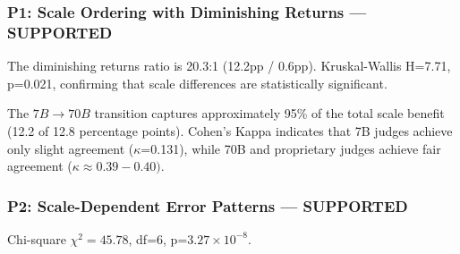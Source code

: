 
\subsubsection{P1: Scale Ordering with Diminishing Returns --- SUPPORTED}

\begin{table}[htbp]
\centering
{}
\end{table}

The diminishing returns ratio is 20.3:1 (12.2pp / 0.6pp). Kruskal-Wallis H=7.71, p=0.021, confirming that scale differences are statistically significant.

The $7B\rightarrow 70B$ transition captures approximately 95\% of the total scale benefit (12.2 of 12.8 percentage points). Cohen's Kappa indicates that 7B judges achieve only slight agreement ($\kappa$=0.131), while 70B and proprietary judges achieve fair agreement ($\kappa\approx 0.39-0.40)$.

\subsubsection{P2: Scale-Dependent Error Patterns --- SUPPORTED}

\begin{table}[htbp]
\centering
{}
\end{table}

Chi-square $\chi^{2}=45.78$, df=6, p=3.$27\times 10^{-8}$.

